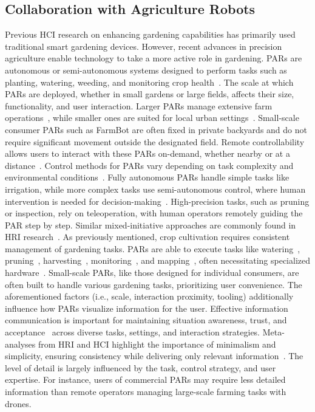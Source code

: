 \subsection{Collaboration with Agriculture Robots}\label{subsec:rel-robots}
Previous HCI research on enhancing gardening capabilities has primarily used traditional smart gardening devices. However, recent advances in precision agriculture enable technology to take a more active role in gardening. PARs are autonomous or semi-autonomous systems designed to perform tasks such as planting, watering, weeding, and monitoring crop health~\cite{bechar2021, vasconez2019}. The scale at which PARs are deployed, whether in small gardens or large fields, affects their size, functionality, and user interaction. Larger PARs manage extensive farm operations~\cite{PARLarge}, while smaller ones are suited for local urban settings~\cite{goddard2021}. Small-scale consumer PARs such as FarmBot are often fixed in private backyards and do not require significant movement outside the designated field. Remote controllability allows users to interact with these PARs on-demand, whether nearby or at a distance~\cite{vasconez2019}. Control methods for PARs vary depending on task complexity and environmental conditions~\cite{controlmethod1, controlmethod2tax}. Fully autonomous PARs handle simple tasks like irrigation, while more complex tasks use semi-autonomous control, where human intervention is needed for decision-making~\cite{vasconez2019}. High-precision tasks, such as pruning or inspection, rely on teleoperation, with human operators remotely guiding the PAR step by step. Similar mixed-initiative approaches are commonly found in HRI research~\cite{control3, controlmethod2tax}.
As previously mentioned, crop cultivation requires consistent management of gardening tasks. PARs are able to execute tasks like watering~\cite{irrigationSpraying,irrigationSpraying2}, pruning~\cite{pruning}, harvesting~\cite{bac2014harvesting,harvesting2}, monitoring~\cite{monitoring,lunadei2012monitoring}, and mapping~\cite{mapping}, often necessitating specialized hardware~\cite{vasconez2019}. Small-scale PARs, like those designed for individual consumers, are often built to handle various gardening tasks, prioritizing user convenience. The aforementioned factors (i.e., scale, interaction proximity, tooling) additionally influence how PARs visualize information for the user. Effective information communication is important for maintaining situation awareness, trust, and acceptance~\cite{hriMetrics} across diverse tasks, settings, and interaction strategies. Meta-analyses from HRI and HCI highlight the importance of minimalism and simplicity, ensuring consistency while delivering only relevant information~\cite{controlmethod1, controlmethod2tax}. The level of detail is largely influenced by the task, control strategy, and user expertise. For instance, users of commercial PARs may require less detailed information than remote operators managing large-scale farming tasks with drones.\\ 

